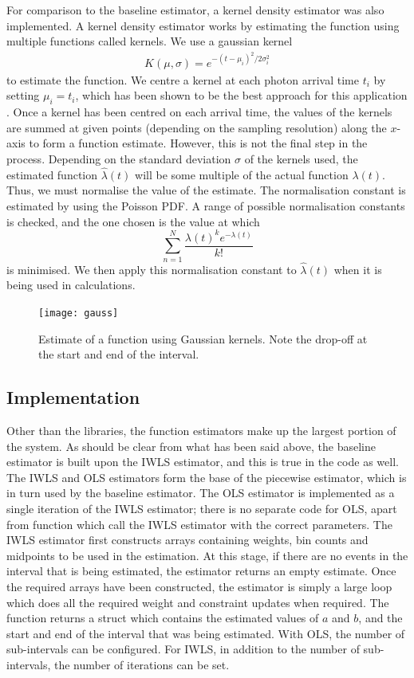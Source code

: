 \documentclass[a4paper,11pt]{article}
\begin{document}
   For comparison to the baseline estimator, a kernel density estimator was also
   implemented. A kernel density estimator works by estimating the function using
   multiple functions called kernels. We use a gaussian kernel 
   \begin{align}
   K(\mu,\sigma)=e^{-(t-\mu_i)^2/2\sigma_i^2}
   \end{align}
   to estimate the function. We centre a kernel at each photon arrival time $t_i$
   by setting $\mu_i=t_i$, which has been shown to be the best approach for this
   application \cite{cuevas2006accurate}. Once a kernel has been centred on each
   arrival time, the values of the kernels are summed at given points (depending on
   the sampling resolution) along the $x$-axis to form a function
   estimate. However, this is not the final step in the process. Depending on the
   standard deviation $\sigma$ of the kernels used, the estimated function
   $\hat{\lambda}(t)$ will be some multiple of the actual function
   $\lambda(t)$. Thus, we must normalise the value of the estimate. The
   normalisation constant is estimated by using the Poisson PDF. A range of
   possible normalisation constants is checked, and the one chosen is the value at
   which
   \begin{equation}
   \sum_{n=1}^N\frac{\lambda(t)^ke^{-\lambda(t)}}{k!}
   \end{equation}
   is minimised. We then apply this normalisation constant to $\hat{\lambda}(t)$
   when it is being used in calculations.
   \begin{figure}
   \texttt{[image: gauss]}
   \caption{Estimate of a function using Gaussian kernels. Note the drop-off at the
   start and end of the interval.}
   \label{fig:kde}
   \end{figure}
\subsection{Implementation}
\label{sec-6-3}

   Other than the libraries, the function estimators make up the largest portion
   of the system. As should be clear from what has been said above, the baseline
   estimator is built upon the IWLS estimator, and this is true in the code as
   well. The IWLS and OLS estimators form the base of the piecewise estimator,
   which is in turn used by the baseline estimator. The OLS estimator is
   implemented as a single iteration of the IWLS estimator; there is no separate
   code for OLS, apart from function which call the IWLS estimator with the
   correct parameters. The IWLS estimator first constructs arrays containing
   weights, bin counts and midpoints to be used in the estimation. At this
   stage, if there are no events in the interval that is being estimated, the
   estimator returns an empty estimate. Once the required arrays have been
   constructed, the estimator is simply a large loop which does all the required
   weight and constraint updates when required. The function returns a struct
   which contains the estimated values of $a$ and $b$, and the start and end of
   the interval that was being estimated. With OLS, the number of sub-intervals
   can be configured. For IWLS, in addition to the number of sub-intervals, the
   number of iterations can be set.
\end{document}
